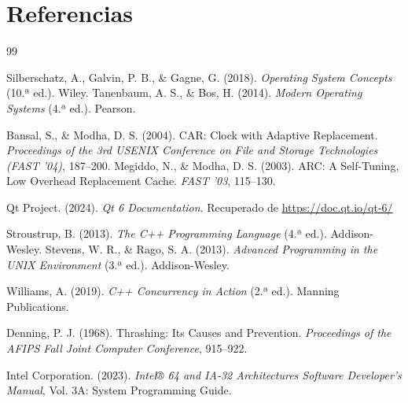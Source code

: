 \documentclass[12pt,letterpaper]{article}
\begin{document}
\section{Referencias}

\begin{thebibliography}{99}

Silberschatz, A., Galvin, P. B., \& Gagne, G. (2018). \textit{Operating System Concepts} (10.ª ed.). Wiley.
Tanenbaum, A. S., \& Bos, H. (2014). \textit{Modern Operating Systems} (4.ª ed.). Pearson.

Bansal, S., \& Modha, D. S. (2004).
CAR: Clock with Adaptive Replacement. \textit{Proceedings of the 3rd USENIX Conference on File and Storage Technologies (FAST '04)}, 187--200.
Megiddo, N., \& Modha, D. S. (2003). ARC: A Self-Tuning, Low Overhead Replacement Cache. \textit{FAST '03}, 115--130.

Qt Project. (2024).
\textit{Qt 6 Documentation}. Recuperado de \url{https://doc.qt.io/qt-6/}

Stroustrup, B. (2013). \textit{The C++ Programming Language} (4.ª ed.). Addison-Wesley.
Stevens, W. R., \& Rago, S. A. (2013). \textit{Advanced Programming in the UNIX Environment} (3.ª ed.). Addison-Wesley.

Williams, A. (2019).
\textit{C++ Concurrency in Action} (2.ª ed.). Manning Publications.

Denning, P. J. (1968). Thrashing: Its Causes and Prevention.
\textit{Proceedings of the AFIPS Fall Joint Computer Conference}, 915--922.

Intel Corporation. (2023).
\textit{Intel® 64 and IA-32 Architectures Software Developer's Manual}, Vol. 3A: System Programming Guide.

\end{thebibliography}
\end{document}
